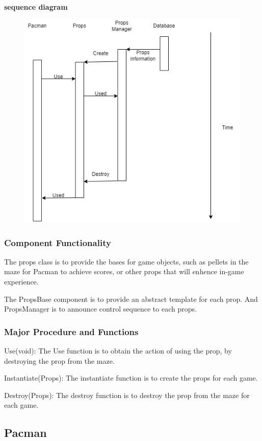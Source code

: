 \documentclass[11pt]{article}
\begin{document}
\textbf{sequence diagram}\\
\begin{figure}[H]
    \centering
    \includegraphics*[scale=0.4]{Props_sequence.png}
\end{figure}
\subsubsection{Component Functionality}
The props class is to provide the bases for game objects, such as pellets in the maze for Pacman to achieve scores, or other props that will enhence in-game experience.

The PropsBase component is to provide an abstract template for each prop. And PropsManager is to announce control sequence to each props.
\subsubsection{Major Procedure and Functions}
Use(void): The Use function is to obtain the action of using the prop, by destroying the prop from the maze.

Instantiate(Props): The instantiate function is to create the props for each game.

Destroy(Props): The destroy function is to destroy the prop from the maze for each game.

\subsection{Pacman}
\end{document}
